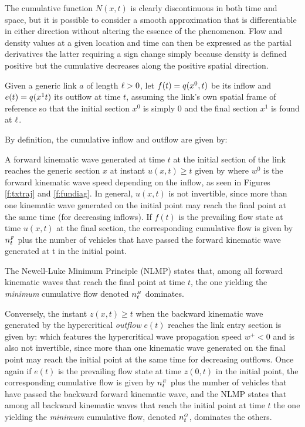 The cumulative function $N(x,t)$ is clearly discontinuous in both time and space, but it is possible to consider a smooth approximation that is differentiable in either direction without altering the essence of the phenomenon. Flow and density values at a given location and time can then be expressed as the partial derivatives
the latter requiring a sign change simply because density is defined positive but the cumulative decreases along the positive spatial direction.

Given a generic link $a$ of length $\ell > 0$, let $f(t) = q(x^0,t)$ be its inflow and $e(t) = q(x^1t)$ its outflow at time $t$, assuming the link's own spatial frame of reference so that the initial section $x^0$ is simply 0 and the final section $x^1$ is found at $\ell$.

By definition, the cumulative inflow and outflow are given by:

A forward kinematic wave generated at time $t$ at the initial section of the link reaches the generic section $x$ at instant $u(x,t) \geqslant t$ given by
where $w^0$ is the forward kinematic wave speed depending on the inflow, as seen in Figures \ref{f:txtraj} and \ref{f:fundiag}. In general, $u(x,t)$ is not invertible, since more than one kinematic wave generated on the initial point may reach the final point at the same time (for decreasing inflows). If $f(t)$ is the prevailing flow state at time $u(x,t)$ at the final section, the corresponding cumulative flow is given by $n_{t}^{\scriptscriptstyle{F}}$ plus the number of vehicles that have passed the forward kinematic wave generated at t in the initial point.

The Newell-Luke Minimum Principle (NLMP) states that, among all forward kinematic waves that reach the final point at time $t$, the one yielding the \emph{minimum} cumulative flow denoted $n_{t}^{\scriptscriptstyle{H}}$ dominates.

Conversely, the instant $z(x,t) \geqslant t$ when the backward kinematic wave generated by the hypercritical \emph{outflow} $e(t)$ reaches the link entry section is given by:
which features the hypercritical wave propagation speed $w^+ < 0$ and is also not invertible, since more than one kinematic wave generated on the final point may reach the initial point at the same time for decreasing outflows. Once again if $e(t)$ is the prevailing flow state at time $z(0,t)$ in the initial point, the corresponding cumulative flow is given by $n_{t}^{\scriptscriptstyle{E}}$ plus the number of vehicles that have passed the backward forward kinematic wave, and the NLMP states that among all backward kinematic waves that reach the initial point at time $t$ the one yielding the \emph{minimum} cumulative flow, denoted $n_{t}^{\scriptscriptstyle{G}}$, dominates the others.

